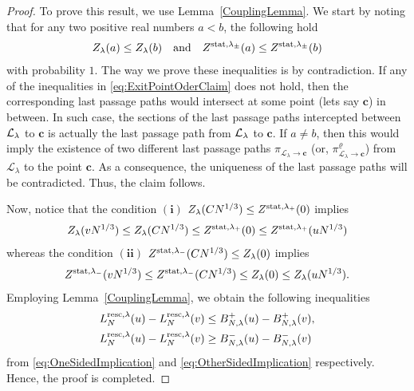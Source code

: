 \documentclass[12pt,a4paper]{article}
\numberwithin{equation}{section}
\begin{document}
\begin{proof}
To prove this result, we use Lemma~\ref{CouplingLemma}. We start by noting that for any two positive real numbers $a<b$, the following hold
\begin{align}\label{eq:ExitPointOderClaim}
Z_\lambda(a)\leq Z_\lambda(b)\quad \textrm{and} \quad Z^{{\rm stat},\lambda_\pm }(a)\leq Z^{{\rm stat},\lambda_\pm}(b)
\end{align}
with probability $1$.
The way we prove these inequalities is by contradiction. If any of the inequalities in \eqref{eq:ExitPointOderClaim} does not hold, then the corresponding last passage paths would intersect at some point (lets say $\mathbf{c}$) in between. In such case, the sections of the last passage paths intercepted between ${\cal L}_{\lambda}$ to $\mathbf{c}$ is actually the last passage path from ${\cal L}_{\lambda}$ to $\mathbf{c}$. If $a\neq b$, then this would imply the existence of two different last passage paths $\pi_{\mathcal{L}_{\lambda}\to \mathbf{c}}$ (or, $\pi^{\varrho}_{\mathcal{L}_{\lambda}\to \mathbf{c}}$) from $\mathcal{L}_{\lambda}$ to the point $\mathbf{c}$. As a consequence, the uniqueness of the last passage paths will be contradicted. Thus, the claim follows.

Now, notice that the condition $\mathbf{(i)}$ $Z_\lambda(CN^{1/3})\leq Z^{{\rm stat},\lambda_+}(0)$ implies
\begin{align}\label{eq:OneSidedImplication}
Z_\lambda(vN^{1/3})\leq Z_\lambda(CN^{1/3})\leq Z^{{\rm stat},\lambda_+}(0)\leq Z^{{\rm stat},\lambda_+}(uN^{1/3})
\end{align}
whereas the condition $\mathbf{(ii)}$ $Z^{{\rm stat},\lambda_-}(CN^{1/3})\leq Z_\lambda(0)$ implies
\begin{align}\label{eq:OtherSidedImplication}
Z^{{\rm stat},\lambda_-}(vN^{1/3})\leq Z^{{\rm stat},\lambda_-}(CN^{1/3})\leq Z_\lambda(0)\leq Z_\lambda(uN^{1/3}).
\end{align}
Employing Lemma~\ref{CouplingLemma}, we obtain the following inequalities
\begin{equation}
\begin{aligned}
 L^{{\rm resc},\lambda}_{N}(u)- L^{{\rm resc},\lambda}_{N}(v)& \leq B^{+}_{N,\lambda}(u) - B^{+}_{N,\lambda}(v),\\
 L^{{\rm resc},\lambda}_{N}(u)- L^{{\rm resc},\lambda}_{N}(v) &\geq B^{-}_{N,\lambda}(u)-B^{-}_{N,\lambda}(v)
\end{aligned}
\end{equation}
from \eqref{eq:OneSidedImplication} and \eqref{eq:OtherSidedImplication} respectively.
Hence, the proof is completed.
\end{proof}
\end{document}
